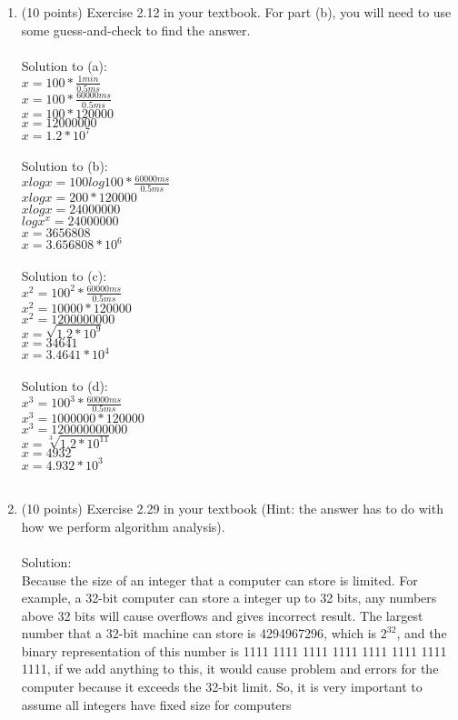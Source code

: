 \documentclass[12pt]{article}
\begin{document}
\begin{enumerate}
\item (10 points) Exercise 2.12 in your textbook. For part (b), you will need to use some 
guess-and-check to find the answer. 
\\\\Solution to (a):
\\$x = 100* \frac{1min}{0.5ms}$
\\$x = 100* \frac{60000ms}{0.5ms}$
\\$x = 100* 120000$
\\$x = 12000000$
\\$x = 1.2 *10^7$
\\\\Solution to (b):
\\$xlogx = 100log100*\frac{60000ms}{0.5ms}$
\\$xlogx = 200*120000$
\\$xlogx = 24000000$
\\$logx^x = 24000000$
\\$x = 3656808$
\\$x = 3.656808*10^6$
\\\\Solution to (c):
\\$x^2 = 100^2 * \frac{60000ms}{0.5ms}$
\\$x^2 = 10000 *120000$
\\$x^2 = 1200000000$
\\$x = \sqrt{1.2*10^9}$
\\$x = 34641$
\\$x = 3.4641*10^4$
\\\\Solution to (d):
\\$x^3 = 100^3 * \frac{60000ms}{0.5ms}$
\\$x^3 = 1000000 *120000$
\\$x^3 = 120000000000$
\\$x = \sqrt[3]{1.2*10^{11}}$
\\$x = 4932$
\\$x = 4.932*10^3$
\\\\

\item (10 points) Exercise 2.29 in your textbook (Hint: the answer has to do with how 
we perform algorithm analysis). 
\\\\Solution:
\\Because the size of an integer that a computer can store is limited. For example, a 32-bit computer can store a integer up to 32 bits, any numbers above 32 bits will cause overflows and gives incorrect result. The largest number that a 32-bit machine can store is 4294967296, which is $2^{32}$, and the binary representation of this number is 1111 1111 1111 1111 1111 1111 1111 1111, if we add anything to this, it would cause problem and errors for the computer because it exceeds the 32-bit limit. So, it is very important to assume all integers have fixed size for computers
\\\\


\end{enumerate}
\end{document}
